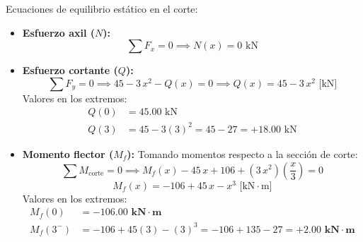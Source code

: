 Ecuaciones de equilibrio estático en el corte:
\begin{itemize}
    \item \textbf{Esfuerzo axil ($N$):}
          \begin{equation}
              \sum F_x = 0 \implies \boxed{N(x) = 0\text{ kN}}
          \end{equation}

    \item \textbf{Esfuerzo cortante ($Q$):}
          \begin{equation}
              \sum F_y = 0 \implies 45 - 3\,x^2 - Q(x) = 0 \implies \boxed{Q(x) = 45 - 3\,x^2\text{ [kN]}}
          \end{equation}
          Valores en los extremos:
          \begin{align*}
              Q(0) & = 45.00\text{ kN}                          \\
              Q(3) & = 45 - 3(3)^2 = 45 - 27 = +18.00\text{ kN}
          \end{align*}

    \item \textbf{Momento flector ($M_f$):}
          Tomando momentos respecto a la sección de corte:
          \begin{equation}
              \sum M_{\text{corte}} = 0 \implies M_f(x) - 45\,x + 106 + (3\,x^2)\left(\frac{x}{3}\right) = 0
          \end{equation}
          \begin{equation}
              \boxed{M_f(x) = -106 + 45\,x - x^3\text{ [kN}\cdot\text{m]}}
          \end{equation}
          Valores en los extremos:
          \begin{align*}
              M_f(0)   & = \mathbf{-106.00\text{ kN}\cdot\text{m}}                                        \\
              M_f(3^-) & = -106 + 45(3) - (3)^3 = -106 + 135 - 27 = \mathbf{+2.00\text{ kN}\cdot\text{m}}
          \end{align*}
\end{itemize}



